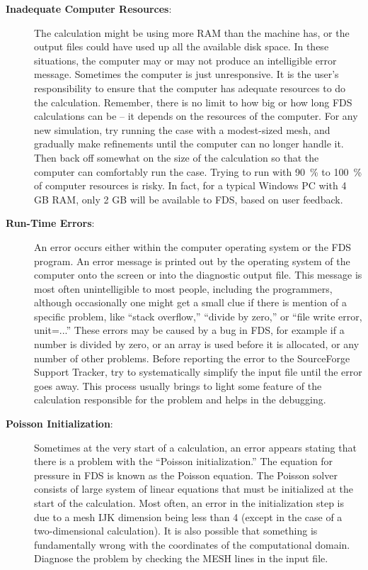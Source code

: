 \documentclass[11pt]{book}
\begin{document}
\begin{description}
\item[{\bf Inadequate Computer Resources}:] The calculation might be using more RAM than the machine
has, or the output files could have used up all the available disk space. In these situations, the
computer may or may not produce an intelligible error message. Sometimes the computer is just
unresponsive. It is the user's responsibility to ensure that the computer has adequate resources to
do the calculation. Remember, there is no limit to how big or how long FDS calculations can be -- it
depends on the resources of the computer. For any new simulation, try running the case with a modest-sized mesh,
and gradually make refinements until the computer can no longer handle it. Then back off
somewhat on the size of the calculation so that the computer can comfortably run the
case. Trying to run with 90~\% to 100~\% of computer resources is risky.
In fact, for a typical Windows PC with 4 GB RAM, only 2 GB will be available to FDS, based on user feedback.

\item[{\bf Run-Time Errors}:] An error occurs either within the computer operating system or the
FDS program. An error message is printed out by the operating system of
the computer onto the screen or into the diagnostic output file. This
message is most often unintelligible to most people, including the programmers,
although occasionally one might get a small clue if there is mention of a specific problem,
like ``stack overflow,'' ``divide by zero,'' or ``file write error, unit=...''
These errors may be caused by a bug in FDS, for example if a number is divided by zero,
or an array is used before it is allocated, or any number of other problems.
Before reporting the error to the SourceForge Support Tracker, try to systematically simplify the
input file until the error goes away. This process usually brings to light some feature of the
calculation responsible for the problem and helps in the debugging.

\item[{\bf Poisson Initialization}:] Sometimes at the very start of a calculation, an error
appears stating that there is a problem with the ``Poisson initialization.'' The equation for
pressure in FDS is known as the Poisson equation. The Poisson solver consists of large system
of linear equations that must be initialized at the start of the calculation.
Most often, an error in the initialization step is due to a mesh {\ct IJK} dimension
being less than 4 (except in the case of a two-dimensional calculation). It is also possible that something is
fundamentally wrong with the coordinates of the computational domain. Diagnose the problem by
checking the {\ct MESH} lines in the input file.
\end{description}
\end{document}
